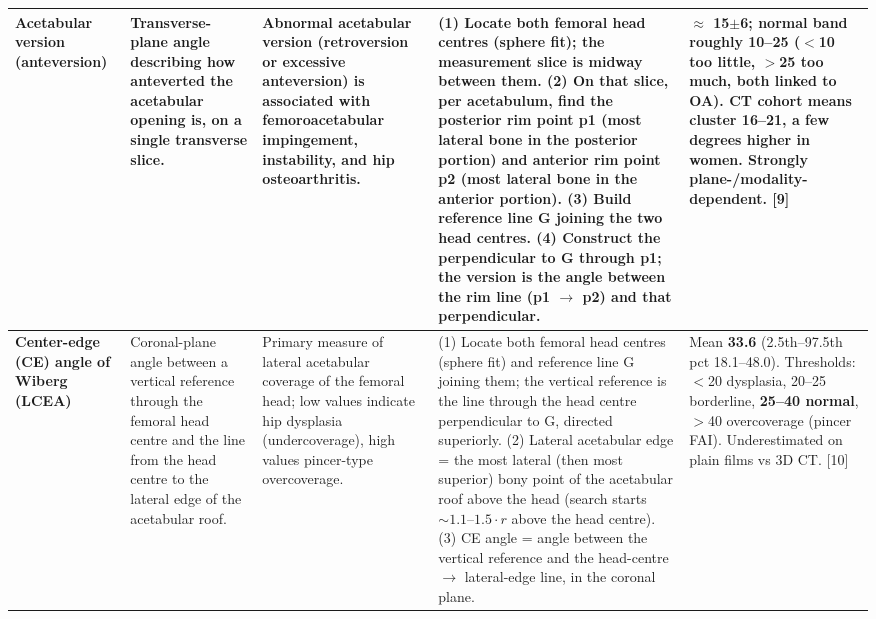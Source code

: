 \documentclass[10pt]{article}
\begin{document}
\begin{footnotesize}
\begin{longtable}{L{2.5cm} L{4.0cm} L{4.0cm} L{9.2cm} L{5.4cm}}
\textbf{Acetabular version (anteversion)} &
Transverse-plane angle describing how anteverted the acetabular opening is, on a single
transverse slice. &
Abnormal acetabular version (retroversion or excessive anteversion) is associated with
femoroacetabular impingement, instability, and hip osteoarthritis. &
(1) Locate both femoral head centres (sphere fit); the measurement slice is midway
between them. (2) On that slice, per acetabulum, find the posterior rim point p1 (most
lateral bone in the posterior portion) and anterior rim point p2 (most lateral bone in
the anterior portion). (3) Build reference line G joining the two head centres.
(4) Construct the perpendicular to G through p1; the version is the angle between the
rim line (p1 $\rightarrow$ p2) and that perpendicular. &
$\approx$ \textbf{15\textdegree{}$\pm$6\textdegree{}}; normal band roughly
\textbf{10--25\textdegree{}} ($<$10\textdegree{} too little, $>$25\textdegree{} too much,
both linked to OA). CT cohort means cluster 16--21\textdegree{}, a few degrees higher in
women. Strongly plane-/modality-dependent. [9] \\
\midrule

\textbf{Center-edge (CE) angle of Wiberg (LCEA)} &
Coronal-plane angle between a vertical reference through the femoral head centre and the
line from the head centre to the lateral edge of the acetabular roof. &
Primary measure of lateral acetabular coverage of the femoral head; low values indicate
hip dysplasia (undercoverage), high values pincer-type overcoverage. &
(1) Locate both femoral head centres (sphere fit) and reference line G joining them; the
vertical reference is the line through the head centre perpendicular to G, directed
superiorly. (2) Lateral acetabular edge = the most lateral (then most superior) bony
point of the acetabular roof above the head (search starts ${\sim}1.1\text{--}1.5\cdot r$
above the head centre). (3) CE angle = angle between the vertical reference and the
head-centre $\rightarrow$ lateral-edge line, in the coronal plane. &
Mean \textbf{33.6\textdegree{}} (2.5th--97.5th pct 18.1--48.0\textdegree{}). Thresholds:
$<$20\textdegree{} dysplasia, 20--25\textdegree{} borderline, \textbf{25--40\textdegree{}
normal}, $>$40\textdegree{} overcoverage (pincer FAI). Underestimated on plain films vs
3D CT. [10] \\
\midrule


\end{longtable}
\end{footnotesize}
\end{document}
